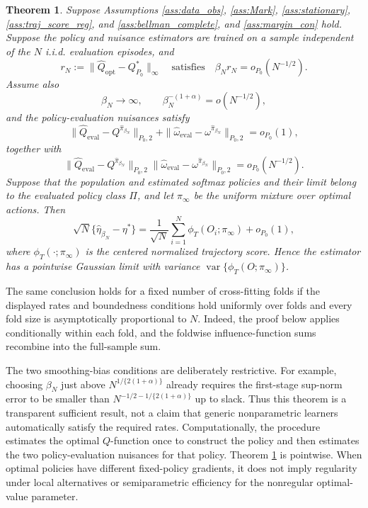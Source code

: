 \documentclass[12pt]{article}
\newtheorem{theorem}{Theorem}[section]
\theoremstyle{remark}\newtheorem{remark}[theorem]{Remark}\theoremstyle{plain}
\newcommand{\var}{\operatorname{var}}
\begin{document}
\begin{theorem}\label{thm:smoothing_RAL}
    Suppose Assumptions \ref{ass:data_obs}, \ref{ass:Mark},
    \ref{ass:stationary}, \ref{ass:traj_score_reg}, and
    \ref{ass:bellman_complete}, and \ref{ass:margin_con} hold.
    Suppose the policy and nuisance
    estimators are trained on a sample independent of the $N$ i.i.d.
    evaluation episodes, and
    \[
        r_N:=\|\widehat Q_{\mathrm{opt}}-Q_{P_0}^*\|_\infty
        \quad\text{satisfies}\quad
        \beta_N r_N=o_{P_0}(N^{-1/2}).
    \]
    Assume also
    \[
        \beta_N\to\infty,\qquad
        \beta_N^{-(1+\alpha)}=o(N^{-1/2}),
    \]
    and the policy-evaluation nuisances satisfy
    \[
        \|\widehat Q_{\mathrm{eval}}
        -Q^{\widehat\pi_{\beta_N}}\|_{P_0,2}
        +
        \|\widehat\omega_{\mathrm{eval}}
        -\omega^{\widehat\pi_{\beta_N}}\|_{P_0,2}
        =o_{P_0}(1),
    \]
    together with
    \[
        \|\widehat Q_{\mathrm{eval}}
        -Q^{\widehat\pi_{\beta_N}}\|_{P_0,2}
        \|\widehat\omega_{\mathrm{eval}}
        -\omega^{\widehat\pi_{\beta_N}}\|_{P_0,2}
        =o_{P_0}(N^{-1/2}).
    \]
    Suppose that the population and estimated softmax policies and
    their limit belong to the evaluated policy class $\Pi$, and let
    $\pi_\infty$ be the uniform mixture over optimal actions.  Then
    \[
        \sqrt N\{\widehat\eta_{\beta_N}-\eta^*\}
        =
        \frac1{\sqrt N}\sum_{i=1}^N
        \phi_T(O_i;\pi_\infty)+o_{P_0}(1),
    \]
    where $\phi_T(\cdot;\pi_\infty)$ is the centered normalized
    trajectory score.  Hence the estimator has a pointwise Gaussian
    limit with variance $\var\{\phi_T(O;\pi_\infty)\}$.
\end{theorem}

The same conclusion holds for a fixed number of cross-fitting folds
if the displayed rates and boundedness conditions hold uniformly over
folds and every fold size is asymptotically proportional to $N$.
Indeed, the proof below applies conditionally within each fold, and
the foldwise influence-function sums recombine into the full-sample
sum.

The two smoothing-bias conditions are deliberately restrictive.  For
example, choosing $\beta_N$ just above
$N^{1/\{2(1+\alpha)\}}$ already requires the first-stage sup-norm
error to be smaller than
$N^{-1/2-1/\{2(1+\alpha)\}}$ up to slack.  Thus this theorem is a
transparent sufficient result, not a claim that generic
nonparametric learners automatically satisfy the required rates.
Computationally, the procedure estimates the optimal $Q$-function
once to construct the policy and then estimates the two
policy-evaluation nuisances for that policy.
Theorem \ref{thm:smoothing_RAL} is pointwise.  When optimal policies
have different fixed-policy gradients, it does not imply regularity
under local alternatives or semiparametric efficiency for the
nonregular optimal-value parameter.%
\end{document}
